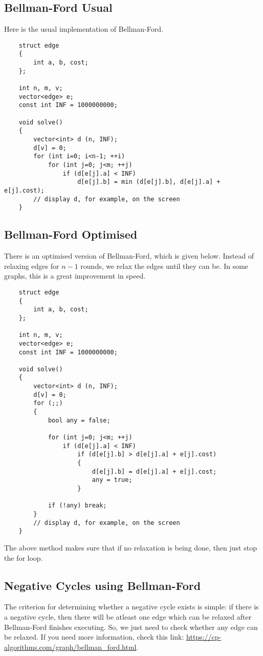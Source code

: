 \documentclass[12pt,a4paper]{amsart}
\numberwithin{equation}{section}
\theoremstyle{definition}
\begin{document}
\subsection{Bellman-Ford Usual} Here is the usual implementation of Bellman-Ford. 

\begin{lstlisting}
    struct edge
    {
        int a, b, cost;
    };

    int n, m, v;
    vector<edge> e;
    const int INF = 1000000000;

    void solve()
    {
        vector<int> d (n, INF);
        d[v] = 0;
        for (int i=0; i<n-1; ++i)
            for (int j=0; j<m; ++j)
                if (d[e[j].a] < INF)
                    d[e[j].b] = min (d[e[j].b], d[e[j].a] + e[j].cost);
        // display d, for example, on the screen
    }
\end{lstlisting}

\subsection{Bellman-Ford Optimised} There is an optimised version of Bellman-Ford, which is given below. Instead of relaxing edges for $n - 1$ rounds, we relax the edges until they can be. In some graphs, this is a great improvement in speed. 

\begin{lstlisting}
    struct edge
    {
        int a, b, cost;
    };

    int n, m, v;
    vector<edge> e;
    const int INF = 1000000000;
    
    void solve()
    {
        vector<int> d (n, INF);
        d[v] = 0;
        for (;;)
        {
            bool any = false;
    
            for (int j=0; j<m; ++j)
                if (d[e[j].a] < INF)
                    if (d[e[j].b] > d[e[j].a] + e[j].cost)
                    {
                        d[e[j].b] = d[e[j].a] + e[j].cost;
                        any = true;
                    }

            if (!any) break;
        }
        // display d, for example, on the screen
    }
\end{lstlisting}
The above method makes sure that if no relaxation is being done, then just stop the for loop. 

\subsection{Negative Cycles using Bellman-Ford} The criterion for determining whether a negative cycle exists is simple: if there is a negative cycle, then there will be atleast one edge which can be relaxed after Bellman-Ford finishes executing. So, we just need to check whether any edge can be relaxed. If you need more information, check this link: \url{https://cp-algorithms.com/graph/bellman_ford.html}. 
\end{document}
